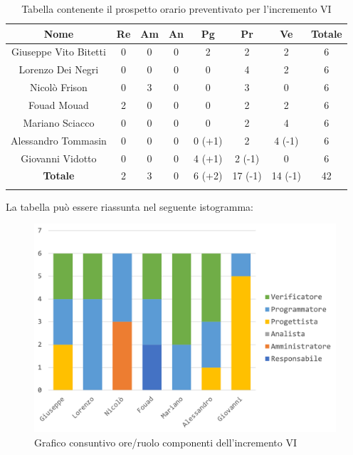 			\begin{longtable}{|c|c|c|c|c|c|c|c}
				\hline
				\rowcolor{lighter-grayer}
				\textbf{Nome} & \textbf{Re} & \textbf{Am} & \textbf{An} & \textbf{Pg}  & \textbf{Pr}   & \textbf{Ve} & \textbf{Totale} \\
				\hline
				\endfirsthead
				\hline
				Giuseppe Vito Bitetti & 0 & 0 & 0 & 2 & 2 & 2 & 6\\
				\hline
				\hline
				Lorenzo Dei Negri & 0 & 0 & 0 & 0 & 4 & 2 & 6\\
				\hline
				\hline
				Nicolò Frison & 0 & 3 & 0 & 0 & 3 & 0 & 6\\
				\hline
				\hline
				Fouad Mouad & 2 & 0 & 0 & 0 & 2 & 2 & 6 \\
				\hline
				\hline
				Mariano Sciacco & 0 & 0 & 0 & 0 & 2 & 4 & 6\\
				\hline
				\hline
				Alessandro Tommasin & 0 & 0 & 0 & 0 (+1) & 2 & 4 (-1) & 6\\
				\hline
				\hline
				Giovanni Vidotto & 0 & 0 & 0 & 4 (+1) & 2 (-1) & 0 & 6\\
				\hline 
				\textbf{Totale} & 2 &  3 & 0 & 6 (+2) & 17 (-1) & 14 (-1) & 42 \\
				\hline  
				
				\caption{Tabella contenente il prospetto orario preventivato per l'incremento VI}
			\end{longtable}
			\pagebreak	
			
			La tabella può essere riassunta nel seguente istogramma:
			
			\begin{figure}[H]
				\centering
				\includegraphics[width=0.8\linewidth]{images/consuntivo/ConsIncr6-1.png}
				\caption{Grafico consuntivo ore/ruolo componenti dell'incremento VI}
				\label{fig:consuntivo grafico suddivione ruoli incremento VI}
			\end{figure}
			

